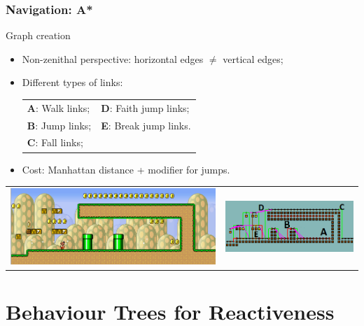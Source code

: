 \documentclass{beamer}
\begin{document}
\begin{frame}{}
	\frametitle{Navigation: A*}
	\begin{block}{Graph creation}
		\begin{itemize}
			\item Non-zenithal perspective: horizontal edges $\neq$ vertical edges;
			\item Different types of links:\\
			\begin{tabular}{ll}
				\textbf{A}: Walk links; & \textbf{D}: Faith jump links;\\
				\textbf{B}: Jump links; & \textbf{E}: Break jump links. \\
				\textbf{C}: Fall links;
			\end{tabular}
			\item Cost: Manhattan distance + modifier for jumps.
		\end{itemize}
		\begin{center}
			\begin{tabular}{cc}
			\includegraphics[width=.45\textwidth]{trap}&
			\includegraphics[width=.45\textwidth]{trapMapNoted}\\
			\end{tabular}
		\end{center}
	\end{block}
	\vfill
\end{frame}

\section{Behaviour Trees for Reactiveness}
\end{document}

